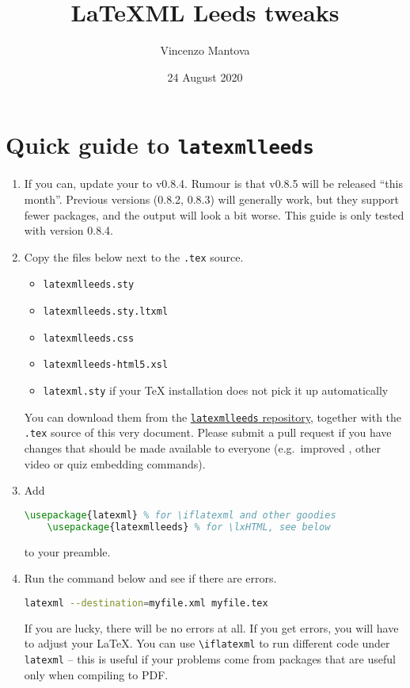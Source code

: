 \documentclass[a4paper]{article}
\title{LaTeXML Leeds tweaks}
\author{Vincenzo Mantova}
\date{24 August 2020}
\theoremstyle{definition}
\begin{document}
\maketitle

\tableofcontents

\section{Quick guide to \texttt{latexmlleeds}}
\begin{enumerate}
  \item If you can, update your \LaTeXML{} to v0.8.4. Rumour is that v0.8.5 will be released ``this month''. Previous versions (0.8.2, 0.8.3) will generally work, but they support fewer packages, and the output will look a bit worse. This guide is only tested with version 0.8.4.
  \item Copy the files below next to the \verb|.tex| source.
  \begin{itemize}
    \item \verb|latexmlleeds.sty|
    \item \verb|latexmlleeds.sty.ltxml|
    \item \verb|latexmlleeds.css|
    \item \verb|latexmlleeds-html5.xsl|
    \item \verb|latexml.sty| if your \TeX{} installation does not pick it up automatically
  \end{itemize}
  You can download them from the \href{https://dev.azure.com/pmtvlm-leeds-ac-uk/public/_git/latexmlleeds}{\texttt{latexmlleeds} repository}, together with the \verb|.tex| source of this very document. Please submit a pull request if you have changes that should be made available to everyone (e.g.\ improved \CSS{}, other video or quiz embedding commands).
  \item Add
  \begin{lstlisting}[language=TeX]
    \usepackage{latexml} % for \iflatexml and other goodies
    \usepackage{latexmlleeds} % for \lxHTML, see below
  \end{lstlisting}
  to your preamble.
  \item Run the command below and see if there are errors.
  \begin{lstlisting}[language=bash]
    latexml --destination=myfile.xml myfile.tex
  \end{lstlisting}
  If you are lucky, there will be no errors at all. If you get errors, you will have to adjust your \LaTeX{}. You can use \verb|\iflatexml| to run different code under \verb|latexml| -- this is useful if your problems come from packages that are useful only when compiling to PDF.

\end{enumerate}
\end{document}
